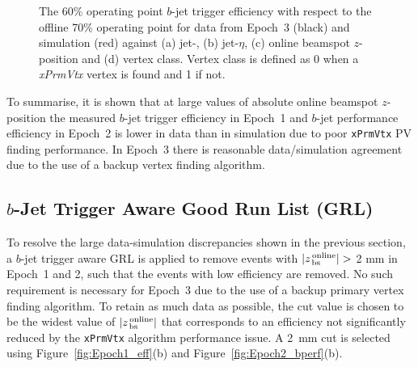 \begin{figure}[!htb]
\vspace{-1em}
\caption[  The $b$-jet trigger efficiency for data from Epoch~3 and simulation.]
        {
          The 60\% operating point $b$-jet trigger efficiency with respect to the offline 70\% operating point
          for data from Epoch~3 (black) and simulation (red) against (a) jet-\pT, (b) jet-$\eta$,
          (c) online beamspot $z$-position and (d) vertex class.
          Vertex class is defined as 0 when a \textit{xPrmVtx} vertex is found and 1 if not.}
\label{fig:Epoch3_eff}
\end{figure}

To summarise, it is shown that at large values of absolute online beamspot $z$-position
the measured $b$-jet trigger efficiency in Epoch~1 and $b$-jet performance efficiency in Epoch~2 is lower in data than in simulation
due to poor \verb|xPrmVtx| PV finding performance.
In Epoch~3 there is reasonable data/simulation agreement due to the use of a backup vertex finding algorithm. 

\newpage
\subsection{$b$-Jet Trigger Aware Good Run List (GRL)}
\label{sec:trig-grl}

To resolve the large data-simulation discrepancies shown in the previous section,
a $b$-jet trigger aware GRL is applied to remove events with $|z_{\,\text{bs}}^{\text{\,online}}| >$ 2 mm in Epoch~1 and 2,
such that the events with low efficiency are removed. No such requirement is necessary for Epoch~3 due to the use of a backup primary vertex finding algorithm.
To retain as much data as possible, the cut value is chosen to be the widest value of $|z_{\,\text{bs}}^{\text{\,online}}|$
that corresponds to an efficiency not significantly reduced by the \verb|xPrmVtx| algorithm performance issue.
A \SI{2}{\mm} cut is selected using Figure~\ref{fig:Epoch1_eff}(b) and Figure~\ref{fig:Epoch2_bperf}(b).

